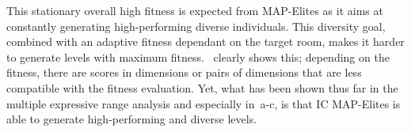 This stationary overall high fitness is expected from MAP-Elites as it aims at constantly generating high-performing diverse individuals. This diversity goal, combined with an adaptive fitness dependant on the target room, makes it harder to generate levels with maximum fitness.~ clearly shows this; depending on the fitness, there are scores in dimensions or pairs of dimensions that are less compatible with the fitness evaluation. Yet, what has been shown thus far in the multiple expressive range analysis and especially in~a-c, is that IC MAP-Elites is able to generate high-performing and diverse levels. 






